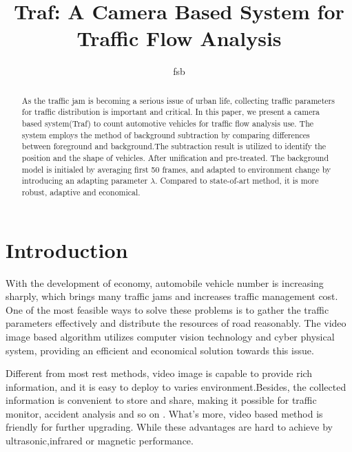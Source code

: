 \documentclass[draftclsnofoot,onecolumn]{IEEEtran}
\begin{document}
\title{Traf: A Camera Based System for Traffic Flow Analysis}
\maketitle
\author{fsb}

\begin{abstract}
As the traffic jam is becoming a serious issue of urban life, collecting traffic parameters for traffic distribution is important and critical.
In this paper, we present a camera based system(Traf) to count automotive vehicles for traffic flow analysis use. The system employs the method of background subtraction by comparing differences between foreground and background.The subtraction result is utilized to identify the position and the shape of vehicles. After unification and pre-treated. The background model is initialed by averaging first 50 frames, and adapted to environment change by introducing an adapting parameter $\lambda$. Compared to state-of-art method, it is more robust, adaptive and economical.

\end{abstract}


\section{Introduction}
  With the development of economy, automobile vehicle number is increasing sharply, which brings many traffic jams and increases traffic management cost\cite{sugiyama2008traffic}. One of the most feasible ways to solve these problems is to gather the traffic parameters effectively and distribute the resources of road reasonably\cite{timotheou2015distributed,ni2013rgbd}. The video image based algorithm utilizes computer vision technology\cite{yang2015construction} and cyber physical system, providing an efficient and economical solution towards this issue.

	Different from most rest methods, video image is capable to provide rich information, and it is easy to deploy to varies environment.Besides, the collected information is convenient to store and share, making it possible for traffic monitor, accident analysis and so on \cite{zaccaro2015assessing}. What's more, video based method is friendly for further upgrading. While these advantages are hard to achieve by ultrasonic\cite{jo2014traffic},infrared\cite{harrison2014cognitive} or magnetic performance\cite{ma2016distribution}.
\end{document}
